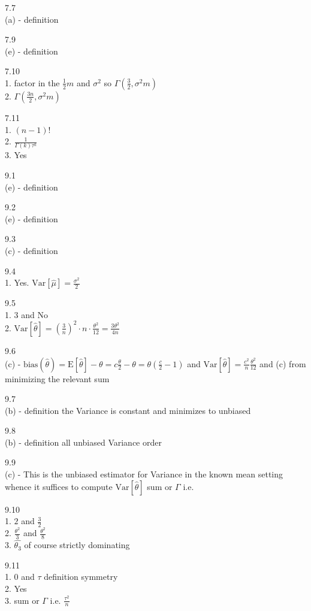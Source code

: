 7.7 \\
(a) - definition

7.9 \\
(e) - definition

7.10 \\
1. factor in the $\frac{1}{2} m$ and $\sigma^2$ so $\Gamma (\frac{3}{2}, \sigma^2 m)$\\
2. $\Gamma (\frac{3n}{2}, \sigma^2 m)$

7.11 \\
1. $(n-1)!$\\
2. $\frac{1}{\Gamma (k) \tau^k}$\\
3. Yes

\newpage

9.1 \\
(e) - definition

9.2 \\
(e) - definition

9.3 \\
(c) - definition

9.4 \\
1. Yes. $\text{Var}[\hat{\mu}]=\frac{\sigma^2}{2}$

9.5 \\
1. $3$ and No \\
2. $\text{Var}[\hat{\theta}]=(\frac{3}{n})^2\cdot n\cdot \frac{\theta^2}{12}=\frac{3\theta^2}{4n}$

9.6 \\
(c) - $\text{bias}(\hat{\theta})=\text{E}[\hat{\theta}]-\theta=c\frac{\theta}{2}-\theta=\theta(\frac{c}{2}-1)$ and $\text{Var}[\hat{\theta}]=\frac{c^2}{n}\frac{\theta^2}{12}$ and (c) from minimizing the relevant sum

9.7 \\
(b) - definition the Variance is constant and minimizes to unbiased

9.8 \\
(b) - definition all unbiased Variance order

9.9 \\
(c) - This is the unbiased estimator for Variance in the known mean setting whence it suffices to compute $\text{Var}[\hat{\theta}]$ sum or $\Gamma$ i.e.

9.10 \\
1. $2$ and $\frac{3}{2}$\\
2. $\frac{\theta^2}{3}$ and $\frac{\theta^2}{8}$\\
3. $\hat{\theta_3}$ of course strictly dominating

9.11 \\
1. $0$ and $\tau$ definition symmetry \\
2. Yes \\
3. sum or $\Gamma$ i.e. $\frac{\tau^2}{n}$


